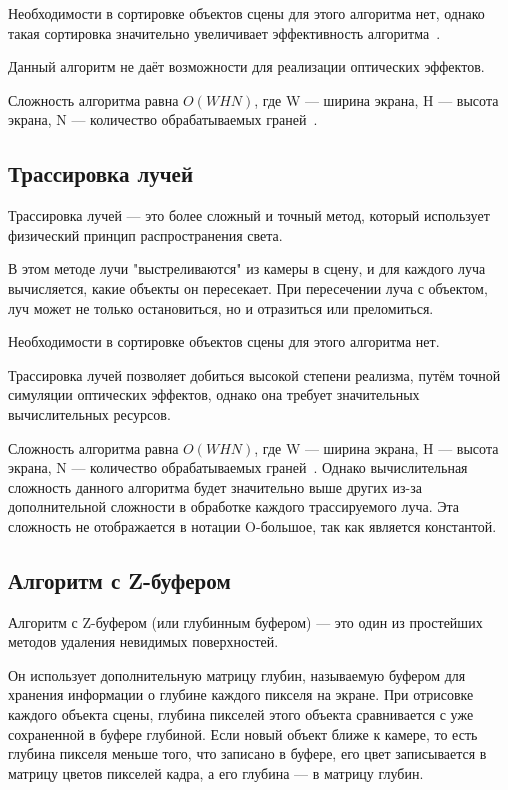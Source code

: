 Необходимости в сортировке объектов сцены для этого алгоритма нет, однако такая сортировка значительно увеличивает эффективность алгоритма~\cite{Rogers}.

Данный алгоритм не даёт возможности для реализации оптических эффектов.

Сложность алгоритма равна $O(WHN)$, где W --- ширина экрана, H --- высота экрана, N --- количество обрабатываемых граней~\cite{Rogers}.

\subsection*{Трассировка лучей}

Трассировка лучей --- это более сложный и точный метод, который использует физический принцип распространения света. 

В этом методе лучи "выстреливаются" из камеры в сцену, и для каждого луча вычисляется, какие объекты он пересекает. При пересечении луча с объектом, луч может не только остановиться, но и отразиться или преломиться. 

Необходимости в сортировке объектов сцены для этого алгоритма нет.

Трассировка лучей позволяет добиться высокой степени реализма, путём точной симуляции оптических эффектов, однако она требует значительных вычислительных ресурсов.

Сложность алгоритма равна $O(WHN)$, где W --- ширина экрана, H --- высота экрана, N --- количество обрабатываемых граней~\cite{Rogers}. Однако вычислительная сложность данного алгоритма будет значительно выше других из-за дополнительной сложности в обработке каждого трассируемого луча. Эта сложность не отображается в нотации O-большое, так как является константой.

\subsection*{Алгоритм с Z-буфером}

Алгоритм с Z-буфером (или глубинным буфером) --- это один из простейших~\cite{Rogers} методов удаления невидимых поверхностей. 

Он использует дополнительную матрицу глубин, называемую буфером для хранения информации о глубине каждого пикселя на экране. При отрисовке каждого объекта сцены, глубина пикселей этого объекта сравнивается с уже сохраненной в буфере глубиной. Если новый объект ближе к камере, то есть глубина пикселя меньше того, что записано в буфере, его цвет записывается в матрицу цветов пикселей кадра, а его глубина --- в матрицу глубин. 

